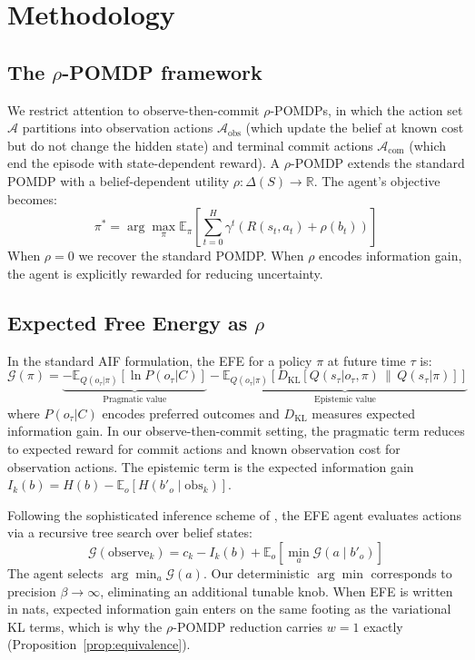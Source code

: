 \documentclass[runningheads]{llncs}
\begin{document}
\section{Methodology}
\label{sec:methodology}

\subsection{The $\rho$-POMDP framework}

We restrict attention to observe-then-commit $\rho$-POMDPs, in which the action set $\mathcal{A}$ partitions into observation actions $\mathcal{A}_\text{obs}$ (which update the belief at known cost but do not change the hidden state) and terminal commit actions $\mathcal{A}_\text{com}$ (which end the episode with state-dependent reward). A $\rho$-POMDP extends the standard POMDP with a belief-dependent utility $\rho : \Delta(S) \rightarrow \mathbb{R}$. The agent's objective becomes:
\begin{equation}
    \pi^* = \arg\max_\pi \mathbb{E}_\pi \left[ \sum_{t=0}^{H} \gamma^t \left( R(s_t, a_t) + \rho(b_t) \right) \right]
\end{equation}
When $\rho = 0$ we recover the standard POMDP. When $\rho$ encodes information gain, the agent is explicitly rewarded for reducing uncertainty.

\subsection{Expected Free Energy as $\rho$}

In the standard AIF formulation, the EFE for a policy $\pi$ at future time $\tau$ is:
\begin{equation}
    \mathcal{G}(\pi) = \underbrace{- \mathbb{E}_{Q(o_\tau|\pi)}[\ln P(o_\tau|C)]}_{\text{Pragmatic value}} - \underbrace{\mathbb{E}_{Q(o_\tau|\pi)}\left[D_{\mathrm{KL}}\left[Q(s_\tau|o_\tau, \pi) \,\|\, Q(s_\tau|\pi)\right]\right]}_{\text{Epistemic value}}
\end{equation}
where $P(o_\tau|C)$ encodes preferred outcomes and $D_{\mathrm{KL}}$ measures expected information gain. In our observe-then-commit setting, the pragmatic term reduces to expected reward for commit actions and known observation cost for observation actions. The epistemic term is the expected information gain $I_k(b) = H(b) - \mathbb{E}_o[H(b'_o \mid \text{obs}_k)]$.

Following the sophisticated inference scheme of \citet{friston2021}, the EFE agent evaluates actions via a recursive tree search over belief states:
\begin{equation}
    \mathcal{G}(\text{observe}_k) = c_k - I_k(b) + \mathbb{E}_{o}\!\left[\min_a \mathcal{G}(a \mid b'_o)\right]
    \label{eq:efe_recursive}
\end{equation}
The agent selects $\arg\min_a \mathcal{G}(a)$. Our deterministic $\arg\min$ corresponds to precision $\beta \to \infty$, eliminating an additional tunable knob. When EFE is written in nats, expected information gain enters on the same footing as the variational KL terms, which is why the $\rho$-POMDP reduction carries $w{=}1$ exactly (Proposition~\ref{prop:equivalence}).
\end{document}
